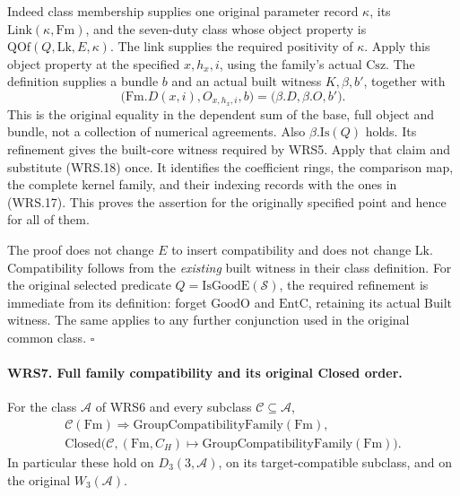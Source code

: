 \documentclass[11pt,a4paper]{article}
\numberwithin{equation}{section}
\theoremstyle{remark}\newtheorem{remark}[theorem]{Remark}
\begin{document}
Indeed class membership supplies one original parameter record
\(\kappa\), its \(\mathrm{Link}(\kappa,\mathrm{Fm})\), and
the seven-duty class whose object property is
\(\mathrm{QOf}(Q,\mathrm{Lk},E,\kappa)\).
The link supplies the required positivity of \(\kappa\).
Apply this object property at the specified \(x,h_x,i\), using
the family's actual \(\mathrm{Csz}\).  The definition supplies
a bundle \(b\) and an actual built witness
\(K,\beta,b'\), together with
\[
  \bigl(\mathrm{Fm}.D(x,i),O_{x,h_x,i},b\bigr)
       =\bigl(\beta.D,\beta.O,b'\bigr).              \tag{WRS.18}
\]
This is the original equality in the dependent sum of the base,
full object and bundle, not a collection of numerical agreements.
Also \(\beta.\mathrm{Is}(Q)\) holds.  Its refinement gives the
built-core witness required by WRS5.  Apply that claim and substitute
(WRS.18) once.  It identifies the coefficient rings, the comparison
map, the complete kernel family, and their indexing records with
the ones in (WRS.17).  This proves the assertion for the originally
specified point and hence for all of them.

The proof does not change \(E\) to insert compatibility and does
not change \(\mathrm{Lk}\).  Compatibility follows from the
\emph{existing} built witness in their class definition.  For the
original selected predicate \(Q=\mathrm{IsGoodE}(\mathcal S)\),
the required refinement is immediate from its definition: forget
\(\mathrm{GoodO}\) and \(\mathrm{EntC}\), retaining its actual
\(\mathrm{Built}\) witness.  The same applies to any further
conjunction used in the original common class.
\hfill\(\square\)

\paragraph{WRS7. Full family compatibility and its original Closed order.}
\label{claim:WRS7}
For the class \(\mathcal A\) of WRS6 and every subclass
\(\mathcal C\subseteq\mathcal A\),
\[
 \begin{gathered}
 \mathcal C(\mathrm{Fm})\Longrightarrow
                 \mathrm{GroupCompatibilityFamily}(\mathrm{Fm}),\\
 \mathrm{Closed}\bigl(\mathcal C,
           (\mathrm{Fm},C_H)\mapsto
                    \mathrm{GroupCompatibilityFamily}(\mathrm{Fm})\bigr).
 \end{gathered}                                                   \tag{WRS.19}
\]
In particular these hold on \(D_3(3,\mathcal A)\), on its
target-compatible subclass, and on the original \(W_3(\mathcal A)\).
\end{document}
